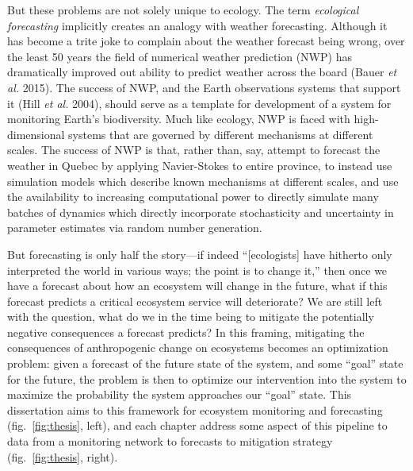 \documentclass[11pt]{article}
\begin{document}
But these problems are not solely unique to ecology. The term
\emph{ecological forecasting} implicitly creates an analogy with weather
forecasting. Although it has become a trite joke to complain about the
weather forecast being wrong, over the least 50 years the field of
numerical weather prediction (NWP) has dramatically improved out ability
to predict weather across the board (Bauer \emph{et al.} 2015). The
success of NWP, and the Earth observations systems that support it (Hill
\emph{et al.} 2004), should serve as a template for development of a
system for monitoring Earth's biodiversity. Much like ecology, NWP is
faced with high-dimensional systems that are governed by different
mechanisms at different scales. The success of NWP is that, rather than,
say, attempt to forecast the weather in Quebec by applying Navier-Stokes
to entire province, to instead use simulation models which describe
known mechanisms at different scales, and use the availability to
increasing computational power to directly simulate many batches of
dynamics which directly incorporate stochasticity and uncertainty in
parameter estimates via random number generation.

But forecasting is only half the story---if indeed ``{[}ecologists{]}
have hitherto only interpreted the world in various ways; the point is
to change it,'' then once we have a forecast about how an ecosystem will
change in the future, what if this forecast predicts a critical
ecosystem service will deteriorate? We are still left with the question,
what do we in the time being to mitigate the potentially negative
consequences a forecast predicts? In this framing, mitigating the
consequences of anthropogenic change on ecosystems becomes an
optimization problem: given a forecast of the future state of the
system, and some ``goal'' state for the future, the problem is then to
optimize our intervention into the system to maximize the probability
the system approaches our ``goal'' state. This dissertation aims to this
framework for ecosystem monitoring and forecasting
(fig.~\ref{fig:thesis}, left), and each chapter address some aspect of
this pipeline to data from a monitoring network to forecasts to
mitigation strategy (fig.~\ref{fig:thesis}, right).
\end{document}
